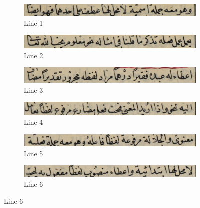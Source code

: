 \begin{figure}[H]
     \centering%
     \begin{subfigure}[b]{0.3\textwidth}
         \centering
         \includegraphics[width=\textwidth]{images/lines/_1.png}
         \caption{Line 1}
     \end{subfigure}
     \hfill%
     \begin{subfigure}[b]{0.3\textwidth}
         \centering
         \includegraphics[width=\textwidth]{images/lines/_2.png}
         \caption{Line 2}
     \end{subfigure}
     \hfill%
     \begin{subfigure}[b]{0.3\textwidth}
         \centering
         \includegraphics[width=\textwidth]{images/lines/_3.png}
         \caption{Line 3}
     \end{subfigure}
     \hfill%
     \begin{subfigure}[b]{0.3\textwidth}
         \centering
         \includegraphics[width=\textwidth]{images/lines/_4.png}
         \caption{Line 4}
     \end{subfigure}
     \hfill%
     \begin{subfigure}[b]{0.3\textwidth}
         \centering
         \includegraphics[width=\textwidth]{images/lines/_5.png}
         \caption{Line 5}
     \end{subfigure}
     \hfill%
     \begin{subfigure}[b]{0.3\textwidth}
         \centering
         \includegraphics[width=\textwidth]{images/lines/_6.png}
         \caption{Line 6}
     \end{subfigure}

\end{figure}

